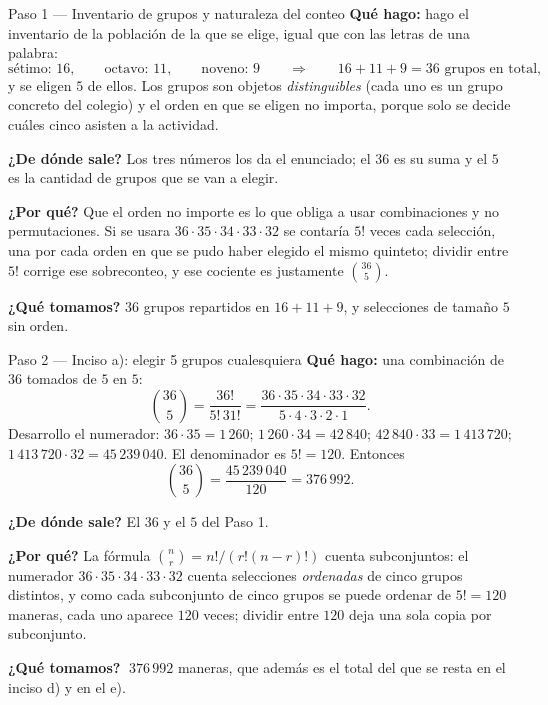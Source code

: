 \documentclass[11pt]{article}
\begin{document}
\begin{paso}{Paso 1 --- Inventario de grupos y naturaleza del conteo}
\textbf{Qué hago:} hago el inventario de la población de la que se elige, igual que con las letras de una
palabra:
\[
\text{sétimo: }16,\qquad \text{octavo: }11,\qquad \text{noveno: }9
\qquad\Longrightarrow\qquad 16+11+9=36 \text{ grupos en total},
\]
y se eligen $5$ de ellos. Los grupos son objetos \emph{distinguibles} (cada uno es un grupo concreto del
colegio) y el orden en que se eligen no importa, porque solo se decide cuáles cinco asisten a la actividad.

\textbf{¿De dónde sale?} Los tres números los da el enunciado; el $36$ es su suma y el $5$ es la cantidad
de grupos que se van a elegir.

\textbf{¿Por qué?} Que el orden no importe es lo que obliga a usar combinaciones y no permutaciones. Si se
usara $36\cdot35\cdot34\cdot33\cdot32$ se contaría $5!$ veces cada selección, una por cada orden en que se
pudo haber elegido el mismo quinteto; dividir entre $5!$ corrige ese sobreconteo, y ese cociente es
justamente $\binom{36}{5}$.

\textbf{¿Qué tomamos?} $36$ grupos repartidos en $16+11+9$, y selecciones de tamaño $5$ sin orden.
\end{paso}

\begin{paso}{Paso 2 --- Inciso a): elegir 5 grupos cualesquiera}
\textbf{Qué hago:} una combinación de $36$ tomados de $5$ en $5$:
\[
\binom{36}{5}=\frac{36!}{5!\,31!}=\frac{36\cdot35\cdot34\cdot33\cdot32}{5\cdot4\cdot3\cdot2\cdot1} .
\]
Desarrollo el numerador: $36\cdot35=1\,260$; $1\,260\cdot34=42\,840$; $42\,840\cdot33=1\,413\,720$;
$1\,413\,720\cdot32=45\,239\,040$. El denominador es $5!=120$. Entonces
\[
\binom{36}{5}=\frac{45\,239\,040}{120}=376\,992 .
\]

\textbf{¿De dónde sale?} El $36$ y el $5$ del Paso 1.

\textbf{¿Por qué?} La fórmula $\binom{n}{r}=n!/(r!(n-r)!)$ cuenta subconjuntos: el numerador
$36\cdot35\cdot34\cdot33\cdot32$ cuenta selecciones \emph{ordenadas} de cinco grupos distintos, y como cada
subconjunto de cinco grupos se puede ordenar de $5!=120$ maneras, cada uno aparece $120$ veces; dividir
entre $120$ deja una sola copia por subconjunto.

\textbf{¿Qué tomamos?} $\;376\,992$ maneras, que además es el total del que se resta en el inciso d) y en
el e).
\end{paso}
\end{document}
